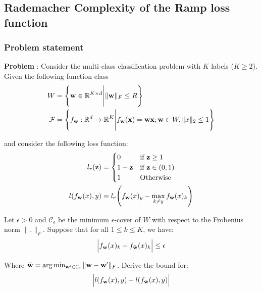 \newpage
\subsection{Rademacher Complexity of the Ramp loss function}

\subsubsection{Problem statement}
\textbf{Problem} : Consider the multi-class classification problem with $K$ labels ($K\ge2$). Given the following function class
\begin{align*}
    W  &= \Bigg\{ 
        {\bf w}\in \mathbb{R}^{K\times d} \Bigg| \|{\bf w}\|_F \le R
     \Bigg\} \\
    \mathcal{F} &= \Bigg\{ 
        f_{{\bf w}}:\mathbb{R}^d \to \mathbb{R}^{K} \Bigg| f_{\bf w}({\bf x}) = {\bf wx}; {\bf w}\in W, \|x\|_2\le 1
     \Bigg\}
\end{align*}

\noindent and consider the following loss function:
\begin{align*}
    l_r({\bf z}) &= \begin{cases}
        0 & \text{if } {\bf z} \ge 1 \\
        1 - {\bf z} &\text{if } {\bf z} \in (0,1) \\ 
        1 &\text{Otherwise}
    \end{cases} \\
    l(f_{\bf w}(x), y) &= l_r\Bigg(f_{\bf w}(x)_y - \max_{k\ne y} f_{\bf w}(x)_k\Bigg)
\end{align*}

\noindent Let $\epsilon > 0$ and $\mathcal{C}_\epsilon$ be the minimum $\epsilon$-cover of $W$ with respect to the Frobenius norm $\|.\|_F$. Suppose that for all $1\le k \le K$, we have:
\begin{align*}
    \Big| 
        f_{\bf w}(x)_k - f_{\bf \bar{w}}(x)_k
     \Big| \le \epsilon
\end{align*}

\noindent Where ${\bf \bar{w}} = \arg\min_{{\bf w'} \in \mathcal{C}_\epsilon} \| {\bf w}-{\bf w'} \|_F$. Derive the bound for:
\begin{align*}
    \Big| 
        l(f_{\bf w}(x), y) - l(f_{\bf \bar{w}}(x), y)
     \Big|
\end{align*}